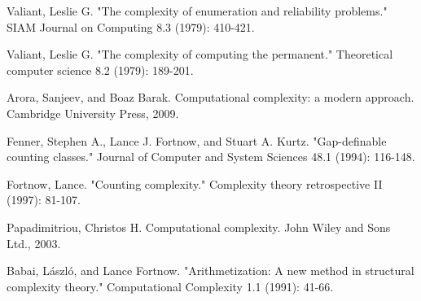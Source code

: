 \documentclass[paper=a4, fontsize=11pt]{scrartcl} %
\numberwithin{equation}{subsection}
\numberwithin{figure}{subsection}
\numberwithin{table}{subsection}
\numberwithin{definition}{subsection}
\numberwithin{theorem}{subsection}
\numberwithin{property}{subsection}
\numberwithin{proposition}{subsection}
\begin{document}
\begin{thebibliography}{1}

 Valiant, Leslie G. "The complexity of enumeration and reliability problems." SIAM Journal on Computing 8.3 (1979): 410-421.

 Valiant, Leslie G. "The complexity of computing the permanent." Theoretical computer science 8.2 (1979): 189-201.

 Arora, Sanjeev, and Boaz Barak. Computational complexity: a modern approach. Cambridge University Press, 2009.

 Fenner, Stephen A., Lance J. Fortnow, and Stuart A. Kurtz. "Gap-definable counting classes." Journal of Computer and System Sciences 48.1 (1994): 116-148.

 Fortnow, Lance. "Counting complexity." Complexity theory retrospective II (1997): 81-107.

 Papadimitriou, Christos H. Computational complexity. John Wiley and Sons Ltd., 2003.

 Babai, László, and Lance Fortnow. "Arithmetization: A new method in structural complexity theory." Computational Complexity 1.1 (1991): 41-66.

\end{thebibliography}
\end{document}
